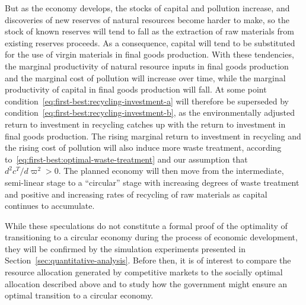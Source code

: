 But as the economy develops, the stocks of capital and pollution increase, and discoveries of new reserves of natural resources become harder to make, so the stock of known reserves will tend to fall as the extraction of raw materials from existing reserves proceeds. As a consequence, capital will tend to be substituted for the use of virgin materials in final goods production. With these tendencies, the marginal productivity of natural resource inputs in final goods production and the marginal cost of pollution will increase over time, while the marginal productivity of capital in final goods production will fall. At some point condition~\eqref{eq:first-best:recycling-investment-a} will therefore be superseded by condition~\eqref{eq:first-best:recycling-investment-b}, as the environmentally adjusted return to investment in recycling catches up with the return to investment in final goods production. The rising marginal return to investment in recycling and the rising cost of pollution will also induce more waste treatment, according to~\eqref{eq:first-best:optimal-waste-treatment} and our assumption that $d^2c^T/d\varpi^2 > 0$. The planned economy will then move from the intermediate, semi-linear stage to a ``circular'' stage with increasing degrees of waste treatment and positive and increasing rates of recycling of raw materials as capital continues to accumulate.

While these speculations do not constitute a formal proof of the optimality of transitioning to a circular economy during the process of economic development, they will be confirmed by the simulation experiments presented in Section~\ref{sec:quantitative-analysis}. Before then, it is of interest to compare the resource allocation generated by competitive markets to the socially optimal allocation described above and to study how the government might ensure an optimal transition to a circular economy.
